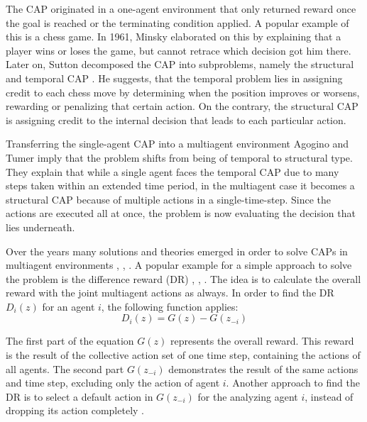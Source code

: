 The CAP originated in a one-agent environment that only returned reward once the goal is reached or the terminating condition applied. A popular example of this is a chess game. In 1961, Minsky \cite{mi61} elaborated on this by explaining that a player wins or loses the game, but cannot retrace which decision got him there. Later on, Sutton decomposed the CAP into subproblems, namely the structural and temporal CAP \cite{su84}. He suggests, that the temporal problem lies in assigning credit to each chess move by determining when the position improves or worsens, rewarding or penalizing that certain action. On the contrary, the structural CAP is assigning credit to the internal decision that leads to each particular action.

Transferring the single-agent CAP into a multiagent environment Agogino and Tumer \cite{agtu04} imply that the problem shifts from being of temporal to structural type. They explain that while a single agent faces the temporal CAP due to many steps taken within an extended time period, in the multiagent case it becomes a structural CAP because of multiple actions in a single-time-step. Since the actions are executed all at once, the problem is now evaluating the decision that lies underneath.

Over the years many solutions and theories emerged in order to solve CAPs in multiagent environments \cite{rabe09}, \cite{zhli20}, \cite{agtu04}. A popular example for a simple approach to solve the problem is the difference reward (DR) \cite{ngku18}, \cite{yltu14}, \cite{agtu04}. The idea is to calculate the overall reward with the joint multiagent actions as always. In order to find the DR $D_i(z)$ for an agent $i$, the following function applies:
\begin{equation}\label{dr}
    D_i(z) = G(z) - G(z_{-i})
\end{equation}

The first part of the equation $G(z)$ represents the overall reward. This reward is the result of the collective action set of one time step, containing the actions of all agents. The second part $G(z_{-i})$ demonstrates the result of the same actions and time step, excluding only the action of agent $i$. Another approach to find the DR is to select a default action in $G(z_{-i})$ for the analyzing agent $i$, instead of dropping its action completely \cite{vega96}.

